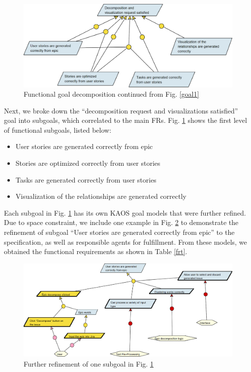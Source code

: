 \begin{figure}
\centering
\includegraphics[width=\textwidth,keepaspectratio]{./figure/GoalsNFR2.png}
\caption{Functional goal decomposition continued from Fig. \ref{goal1}}
\label{frgs}
\end{figure}

Next, we broke down the “decomposition request and visualizations satisfied” goal into subgoals, which correlated to the main FRs. Fig. \ref{frgs} shows the first level of functional subgoals, listed below: 

\begin{itemize}
	\item User stories are generated correctly from epic
	\item Stories are optimized correctly from user stories
	\item Tasks are generated correctly from user stories
	\item Visualization of the relationships are generated correctly
\end{itemize}

Each subgoal in Fig. \ref{frgs} has its own KAOS goal models that were further refined. Due to space constraint, we include one example in Fig. \ref{fr1} to demonstrate the refinement of subgoal ``User stories are generated correctly from epic'' to the specification, as well as responsible agents for fulfillment.  From these models, we obtained the functional requirements as shown in Table \ref{frt}.

\begin{figure}
\centering
\includegraphics[width=\textwidth]{./figure/GoalsFR1.png}
\caption{Further refinement of one subgoal in Fig. \ref{frgs}}
\label{fr1}
\end{figure}

